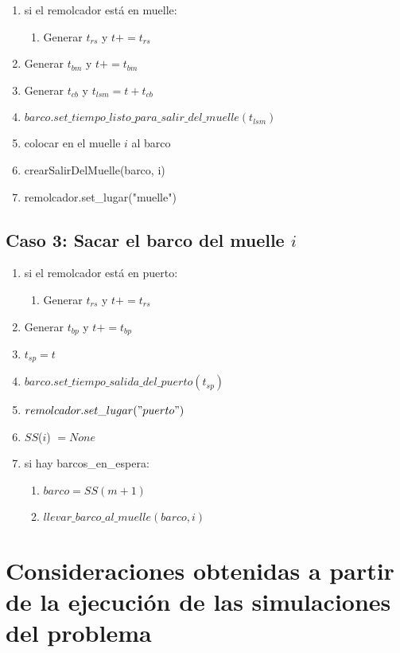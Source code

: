 \documentclass[a4paper,10pt]{article}
\begin{document}
\begin{enumerate}
  \item si el remolcador está en muelle:
  \begin{enumerate}
    \item Generar $t_{rs}$ y $t += t_{rs}$
  \end{enumerate}
  \item Generar $t_{bm}$ y $t+=t_{bm}$
  \item Generar $t_{cb}$ y $t_{lsm} = t + t_{cb}$
  \item $barco.set\_tiempo\_listo\_para\_salir\_del\_muelle(t_{lsm})$
  \item colocar en el muelle $i$ al barco
  \item crearSalirDelMuelle(barco, i)
  \item remolcador.set\_lugar("muelle")
\end{enumerate}

\subsection*{Caso 3: Sacar el barco del muelle $i$}
\begin{enumerate}
  \item si el remolcador está en puerto:
  \begin{enumerate}
    \item Generar $t_{rs}$ y $t+=t_{rs}$
  \end{enumerate}
  
  \item Generar $t_{bp}$ y $t+=t_{bp}$
  \item $t_{sp} = t$
  \item $barco.set\_tiempo\_salida\_del\_puerto(t_{sp})$
  \item $remolcador.set\_lugar("puerto")$
  \item $SS$($i$) $= None$
  \item si hay barcos\_en\_espera:
  \begin{enumerate}
  	\item $barco = SS(m+1)$
  	\item $llevar\_barco\_al\_muelle(barco, i)$
  \end{enumerate}
\end{enumerate}


 \section*{Consideraciones obtenidas a partir de la ejecución de las simulaciones del problema}
\end{document}
